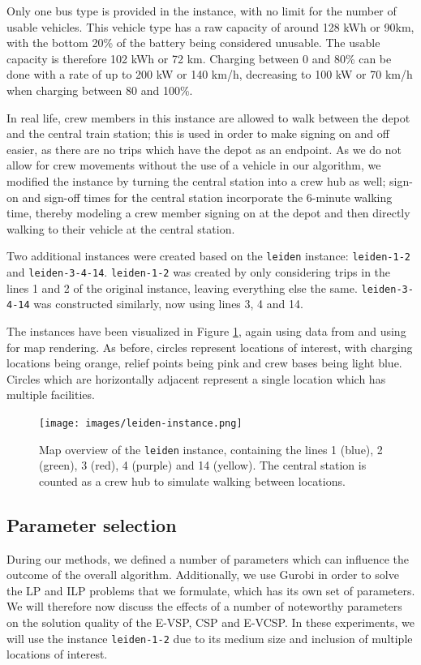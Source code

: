\documentclass[]{article}
\begin{document}
Only one bus type is provided in the instance, with no limit for the number of usable vehicles. This vehicle type has a raw capacity of around 128 kWh or 90km, with the bottom 20\% of the battery being considered unusable. The usable capacity is therefore 102 kWh or 72 km. Charging between 0 and 80\% can be done with a rate of up to 200 kW or 140 km/h, decreasing to 100 kW or 70 km/h when charging between 80 and 100\%.

In real life, crew members in this instance are allowed to walk between the depot and the central train station; this is used in order to make signing on and off easier, as there are no trips which have the depot as an endpoint. As we do not allow for crew movements without the use of a vehicle in our algorithm, we modified the instance by turning the central station into a crew hub as well; sign-on and sign-off times for the central station incorporate the 6-minute walking time, thereby modeling a crew member signing on at the depot and then directly walking to their vehicle at the central station. 

Two additional instances were created based on the \texttt{leiden} instance: \texttt{leiden-1-2} and \texttt{leiden-3-4-14}. \texttt{leiden-1-2} was created by only considering trips in the lines 1 and 2 of the original instance, leaving everything else the same. \texttt{leiden-3-4-14} was constructed similarly, now using lines 3, 4 and 14.

The instances have been visualized in Figure \ref{fig:leiden-map}, again using data from \citet{OpenStreetMap2025} and using \citet{QGIS2025} for map rendering. As before, circles represent locations of interest, with charging locations being orange, relief points being pink and crew bases being light blue. Circles which are horizontally adjacent represent a single location which has multiple facilities.

\begin{figure}[h]
  \centering
  \texttt{[image: images/leiden-instance.png]}
  \caption{Map overview of the \texttt{leiden} instance, containing the lines 1 (blue), 2 (green), 3 (red), 4 (purple) and 14 (yellow). The central station is counted as a crew hub to simulate walking between locations.}
  \label{fig:leiden-map}
\end{figure}

\subsection{Parameter selection} \label{sec:parameter-selection}
During our methods, we defined a number of parameters which can influence the outcome of the overall algorithm. Additionally, we use Gurobi in order to solve the LP and ILP problems that we formulate, which has its own set of parameters. We will therefore now discuss the effects of a number of noteworthy parameters on the solution quality of the E-VSP, CSP and E-VCSP. In these experiments, we will use the instance \texttt{leiden-1-2} due to its medium size and inclusion of multiple locations of interest.  
\end{document}
